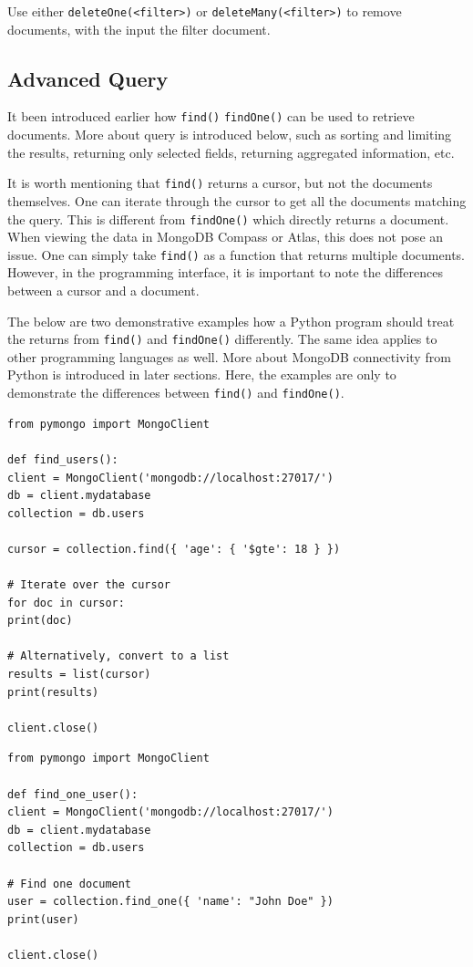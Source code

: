 Use either \verb|deleteOne(<filter>)| or \verb|deleteMany(<filter>)| to remove documents, with the input the filter document.

\subsection{Advanced Query}

It been introduced earlier how \verb|find()| \verb|findOne()| can be used to retrieve documents. More about query is introduced below, such as sorting and limiting the results, returning only selected fields, returning aggregated information, etc.

It is worth mentioning that \verb|find()| returns a cursor, but not the documents themselves. One can iterate through the cursor to get all the documents matching the query. This is different from \verb|findOne()| which directly returns a document. When viewing the data in MongoDB Compass or Atlas, this does not pose an issue. One can simply take \verb|find()| as a function that returns multiple documents. However, in the programming interface, it is important to note the differences between a cursor and a document.

The below are two demonstrative examples how a Python program should treat the returns from \verb|find()| and \verb|findOne()| differently. The same idea applies to other programming languages as well. More about MongoDB connectivity from Python is introduced in later sections. Here, the examples are only to demonstrate the differences between \verb|find()| and \verb|findOne()|.

\begin{lstlisting}
from pymongo import MongoClient

def find_users():
client = MongoClient('mongodb://localhost:27017/')
db = client.mydatabase
collection = db.users

cursor = collection.find({ 'age': { '$gte': 18 } })

# Iterate over the cursor
for doc in cursor:
print(doc)

# Alternatively, convert to a list
results = list(cursor)
print(results)

client.close()
\end{lstlisting}

\begin{lstlisting}
from pymongo import MongoClient

def find_one_user():
client = MongoClient('mongodb://localhost:27017/')
db = client.mydatabase
collection = db.users

# Find one document
user = collection.find_one({ 'name': "John Doe" })
print(user)

client.close()
\end{lstlisting}

